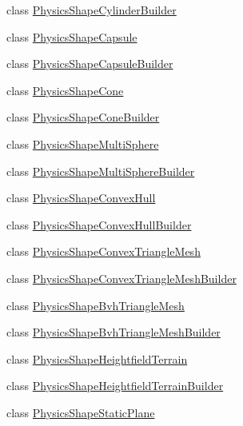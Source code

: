 \begin{DoxyCompactItemize}
class \mbox{\hyperlink{classnjli_1_1_world_factory_a1df6e91827326ced519104ee8edcafb8}{Physics\+Shape\+Cylinder\+Builder}}
\item 
class \mbox{\hyperlink{classnjli_1_1_world_factory_a08be67d95b7957ebd88a3944ff9a7afa}{Physics\+Shape\+Capsule}}
\item 
class \mbox{\hyperlink{classnjli_1_1_world_factory_a47391e36c657b268fe97217194bf713e}{Physics\+Shape\+Capsule\+Builder}}
\item 
class \mbox{\hyperlink{classnjli_1_1_world_factory_a1e046c5bc3ad2999646274d22417d017}{Physics\+Shape\+Cone}}
\item 
class \mbox{\hyperlink{classnjli_1_1_world_factory_a18107e28deb5ee79a2fd4d512772d7ee}{Physics\+Shape\+Cone\+Builder}}
\item 
class \mbox{\hyperlink{classnjli_1_1_world_factory_a6d8dd0dab37f03d905eb3066b816ae30}{Physics\+Shape\+Multi\+Sphere}}
\item 
class \mbox{\hyperlink{classnjli_1_1_world_factory_a71dcdde15201e2df59abaa1bde57e73c}{Physics\+Shape\+Multi\+Sphere\+Builder}}
\item 
class \mbox{\hyperlink{classnjli_1_1_world_factory_a894f78151e6b10ffb19539384b946e12}{Physics\+Shape\+Convex\+Hull}}
\item 
class \mbox{\hyperlink{classnjli_1_1_world_factory_ad33a0bea05e9549fd9950ac4a1acbfa4}{Physics\+Shape\+Convex\+Hull\+Builder}}
\item 
class \mbox{\hyperlink{classnjli_1_1_world_factory_a12f965e3d87c71370f0288e42f12a4cd}{Physics\+Shape\+Convex\+Triangle\+Mesh}}
\item 
class \mbox{\hyperlink{classnjli_1_1_world_factory_abf5b0c4f21459fff5c6ed5cb9fcd96c9}{Physics\+Shape\+Convex\+Triangle\+Mesh\+Builder}}
\item 
class \mbox{\hyperlink{classnjli_1_1_world_factory_a4dc6a23ee90da790604a65d9e0e504d5}{Physics\+Shape\+Bvh\+Triangle\+Mesh}}
\item 
class \mbox{\hyperlink{classnjli_1_1_world_factory_a14ad61e7f0d93976b4a05ddf2bcccf30}{Physics\+Shape\+Bvh\+Triangle\+Mesh\+Builder}}
\item 
class \mbox{\hyperlink{classnjli_1_1_world_factory_af5f61f67c01c8aa161044e2f7669b8e8}{Physics\+Shape\+Heightfield\+Terrain}}
\item 
class \mbox{\hyperlink{classnjli_1_1_world_factory_a0d9797805600b9e2c132b57950ea7926}{Physics\+Shape\+Heightfield\+Terrain\+Builder}}
\item 
class \mbox{\hyperlink{classnjli_1_1_world_factory_af4b40469a84199477879e33321c6f02a}{Physics\+Shape\+Static\+Plane}}

\end{DoxyCompactItemize}
